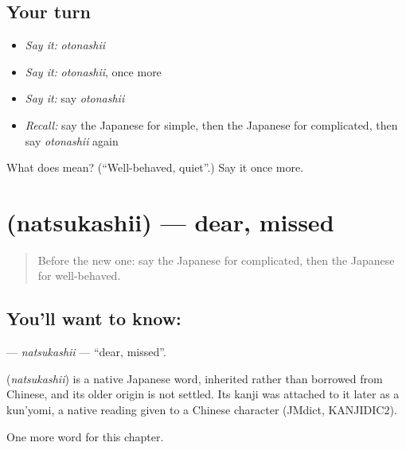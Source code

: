 \subsection*{Your turn}
\begin{itemize}
\raggedright
  \item \emph{Say it:} \emph{otonashii}
  \item \emph{Say it:} \emph{otonashii}, once more
  \item \emph{Say it:} say \emph{otonashii}
  \item \emph{Recall:} say the Japanese for simple, then the Japanese for complicated, then say \emph{otonashii} again
\end{itemize}

\begin{tcolorbox}[breakable,colback=teal!4,colframe=teal!35!black,title={Before you move on}]
What does  mean? (\textquotedblleft{}Well-behaved, quiet\textquotedblright{}.) Say it once more.
\end{tcolorbox}
\section[\texorpdfstring{\ja{なつかしい} (natsukashii)}{なつかしい (natsukashii)}]{ (natsukashii) — dear, missed}

\label{lesson:JA-C123-natsukashii}



\begin{quote}
Before the new one: say the Japanese for complicated, then the Japanese for well-behaved.
\end{quote}

\subsection*{You'll want to know: }
\textbf{} — \emph{natsukashii} — \textquotedblleft{}dear, missed\textquotedblright{}.

\begin{cousinweb}
\textbf{} (\emph{natsukashii}) is a native Japanese word, inherited rather than borrowed from Chinese, and its older origin is not settled. Its kanji was attached to it later as a kun'yomi, a native reading given to a Chinese character (JMdict, KANJIDIC2).
\end{cousinweb}

\begin{grammarlens}[title={What you've built}]
One more word for this chapter.
\end{grammarlens}

